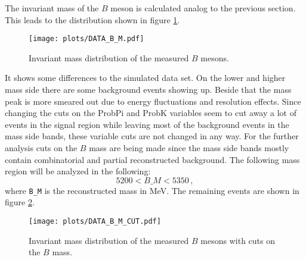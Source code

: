 The invariant mass of the $B$ meson is calculated analog to the previous section.
This leads to the distribution shown in figure \ref{fig:BMData}.
\begin{figure}[!htb]
  \centering
  \texttt{[image: plots/DATA\_B\_M.pdf]}
  \caption{Invariant mass distribution of the measured $B$ mesons.}
  \label{fig:BMData}
\end{figure}
It shows some differences to the simulated data set.
On the lower and higher mass side there are some background events showing up.
Beside that the mass peak is more smeared out due to energy fluctuations and resolution effects.
Since changing the cuts on the ProbPi and ProbK variables seem to cut away a lot of events in the signal region while leaving most of the background events in the mass side bands, these variable cuts are not changed in any way.
For the further analysis cuts on the $B$ mass are being made since the mass side bands mostly contain combinatorial and partial reconstructed background.
The following mass region will be analyzed in the following:
\begin{equation*}
  5200 < B\_M < 5350 \, ,
\end{equation*}
where \texttt{B\_M} is the reconstructed mass in MeV.
The remaining events are shown in figure \ref{fig:BMSignal}.
\begin{figure}[!htb]
  \centering
  \texttt{[image: plots/DATA\_B\_M\_CUT.pdf]}
  \caption{Invariant mass distribution of the measured $B$ mesons with cuts on the $B$ mass.}
  \label{fig:BMSignal}
\end{figure}

